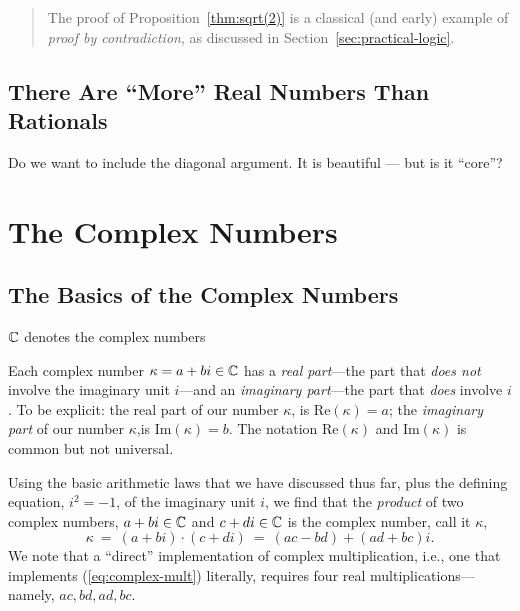 \begin{quote}
The proof of Proposition~\ref{thm:sqrt(2)} is a classical (and early)
example of {\em proof by contradiction}, as discussed in
Section~\ref{sec:practical-logic}.
\end{quote}

\subsection{There Are ``More'' Real Numbers Than Rationals}
\label{sec:Reals-uncountable}

{\Arny Do we want to include the diagonal argument.  It is beautiful
  --- but is it ``core''?}


\section{The Complex Numbers}
\label{sec:complexes}


\subsection{The Basics of the Complex Numbers}

$\mathbb{C}$ denotes the complex numbers

Each complex number $\kappa = a+bi \in \mathbb{C}$ has a {\it real part}---the
part that {\em does not} involve the imaginary unit $i$---and an {\it
  imaginary part}---the part that {\em does} involve $i$.  To be
explicit: the real part of our number $\kappa$, is Re$(\kappa) = a$;
the {\it imaginary part} of our number $\kappa$,is Im$(\kappa) = b$.
The notation Re$(\kappa)$ and Im$(\kappa)$ is common but not
universal.

Using the basic arithmetic laws that we have discussed thus far, plus
the defining equation, $i^2 = -1$, of the imaginary unit $i$, we find
that the {\em product} of two complex numbers, $a+bi \in \mathbb{C}$ and $c+di
\in \mathbb{C}$ is the complex number, call it $\kappa$,
\begin{equation}
\label{eq:complex-mult}
\kappa \ = \ (a+bi) \cdot (c+di) \ = \ (ac - bd) + (ad + bc)i.
\end{equation}
We note that a ``direct'' implementation of complex multiplication,
i.e., one that implements (\ref{eq:complex-mult}) literally, requires
four real multiplications---namely, $ac, bd, ad, bc$.

